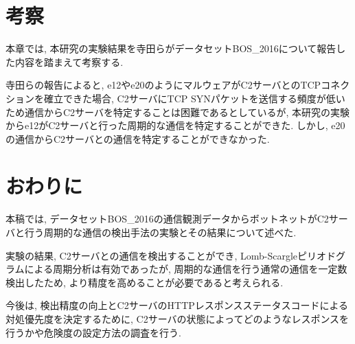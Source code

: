 \documentclass[twocolumn,9pt]{ltjsarticle}
\begin{document}
\section{考察}
本章では, 本研究の実験結果を寺田らがデータセットBOS\_2016について報告した内容\cite{weko_175829_1}を踏まえて考察する. 

寺田らの報告によると, e12やe20のようにマルウェアがC2サーバとのTCPコネクションを確立できた場合, C2サーバにTCP SYNパケットを送信する頻度が低いため通信からC2サーバを特定することは困難であるとしているが, 本研究の実験からe12がC2サーバと行った周期的な通信を特定することができた. しかし, e20の通信からC2サーバとの通信を特定することができなかった. 

\section{おわりに}
本稿では, データセットBOS\_2016の通信観測データからボットネットがC2サーバと行う周期的な通信の検出手法の実験とその結果について述べた. 

実験の結果, C2サーバとの通信を検出することができ, Lomb-Scargleピリオドグラムによる周期分析は有効であったが, 周期的な通信を行う通常の通信を一定数検出したため, より精度を高めることが必要であると考えられる. 

今後は, 検出精度の向上とC2サーバのHTTPレスポンスステータスコードによる対処優先度を決定するために, C2サーバの状態によってどのようなレスポンスを行うかや危険度の設定方法の調査を行う. 



\end{document}
